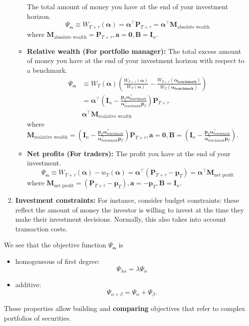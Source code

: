 \documentclass[13pt]{article}
\theoremstyle{definition}
\theoremstyle{remark}
\newenvironment{remark}
  {\pushQED{\qed}\renewcommand{\qedsymbol}{$\triangle$}\remarkx}
  {\popQED\endremarkx}
\begin{document}
\begin{enumerate}
\begin{itemize}
The total amount of money you have at the end of your investment horizon.
$$
\Psi_{\bm{\alpha}} \equiv W_{T+\tau}(\bm{\alpha})=\bm{\alpha}^{\top} \mathbf{P}_{T+\tau}=\bm{\alpha}^{\top}\mathbf{M}_{\text{absolute wealth}}
$$
where $\mathbf{M}_{\text{absolute wealth}}=\mathbf{P}_{T+\tau}, \bm{a}=\bm{0}, \mathbf{B}=\mathbf{I}_n$.
\item \textbf{Relative wealth (For portfolio manager):}
The total excess amount of money you have at the end of your investment horizon with respect to a benchmark.
\begin{align*}
\Psi_{\bm{\alpha}} &\equiv W_{T}(\bm{\alpha})\left(\frac{W_{T+\tau}(\bm{\alpha})}{W_{T}(\bm{\alpha})}-\frac{W_{T+\tau}(\bm{\alpha_{\text{benchmark}}})}{W_{T}(\bm{\alpha_{\text{benchmark}}})}\right)\\&=\bm{\alpha}^\top\left(\mathbf{I}_n-\frac{\mathbf{p}_T\bm{\alpha}_{\text{benchmark}}^\top}{\bm{\alpha}_{\text{benchmark}}^\top \mathbf{p}_T}\right)\mathbf{P}_{T+\tau}\\
&\bm{\alpha}^\top\mathbf{M}_{\text{realative wealth}}
\end{align*}
where $\mathbf{M}_{\text{realative wealth}}=\left(\mathbf{I}_n-\frac{\mathbf{p}_T\bm{\alpha}_{\text{benchmark}}^\top}{\bm{\alpha}_{\text{benchmark}}^\top \mathbf{p}_T}\right)\mathbf{P}_{T+\tau}, \bm{a}=\bm{0}, \mathbf{B}=\left(\mathbf{I}_n-\frac{\mathbf{p}_T\bm{\alpha}_{\text{benchmark}}^\top}{\bm{\alpha}_{\text{benchmark}}^\top \mathbf{p}_T}\right)$.
\item \textbf{Net profits (For traders):}
The profit you have at the end of your investment.
$$
\Psi_{\bm{\alpha}} \equiv W_{T+\tau}(\bm{\alpha})-w_T(\bm{\alpha})=\bm{\alpha}^{\top}\left(\mathbf{P}_{T+\tau}-\mathbf{p}_T\right) = \bm{\alpha}^{\top}\mathbf{M}_{\text{net profit}}
$$
where $\mathbf{M}_{\text{net profit}}=\left(\mathbf{P}_{T+\tau}-\mathbf{p}_T\right), \bm{a}=-\mathbf{p}_T, \mathbf{B}=\mathbf{I}_n$.
    \end{itemize}
\item \textbf{Investment constraints:}
For instance, consider budget constraints: these reflect the amount of money the investor is willing to invest at the time they make their investment decisions. Normally, this also takes into account transaction costs.
 
\end{enumerate}
\begin{remark}
    We see that the objective function $\Psi_{\bm{\alpha}}$ is 
    \begin{itemize}
        \item homogeneous of first degree:
        $$
\Psi_{\lambda \alpha}=\lambda \Psi_\alpha 
$$
\item additive:
$$
\Psi_{\alpha+\beta}=\Psi_\alpha+\Psi_\beta.$$
    \end{itemize}
These properties allow building and \textbf{comparing} objectives that refer to complex portfolios of securities.
\end{remark}
\end{document}
